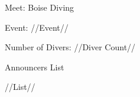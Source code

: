\documentclass[12pt, letterpaper, portrait]{article}
\begin{document}
    Meet: Boise Diving
    
    Event: //Event//

	Number of Divers: //Diver Count//
	
	\begin{center}
		Announcers List
    \end{center}

    //List//
\end{document}
